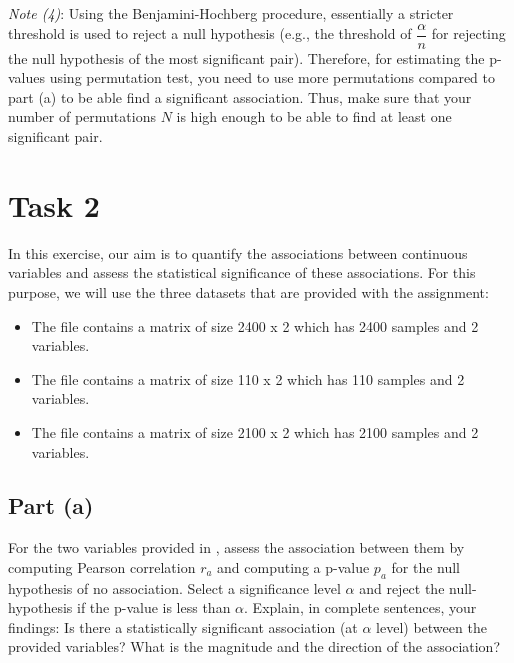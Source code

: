 \documentclass[11pt]{article}
\begin{document}
\vspace{0.2cm}
\noindent
\textit{Note (4)}: Using the Benjamini-Hochberg procedure, essentially a stricter threshold is used to reject a null hypothesis (e.g., the threshold of $\dfrac{\alpha}{n}$ for rejecting the null hypothesis of the most significant pair). Therefore, for estimating the p-values using permutation test, you need to use more permutations compared to part (a) to be able find a significant association. Thus, make sure that your number of permutations $N$ is high enough to be able to find at least one significant pair.

\section{Task 2}
In this exercise, our aim is to quantify the associations between continuous variables and assess the statistical significance of these associations. For this purpose, we will use the three datasets that are provided with the assignment:

\begin{itemize}
	\itemsep -0.3em 
	\item The file \filenameC contains a matrix of size 2400 x 2 which has 2400 samples and 2 variables. 
	\item The file \filenameD contains a matrix of size 110 x 2 which has 110 samples and 2 variables. 
	\item The file \filenameE contains a matrix of size 2100 x 2 which has 2100 samples and 2 variables. 
\end{itemize}

\subsection{Part (a)}

For the two variables provided in \filenameC, assess the association between them by computing Pearson correlation $r_a$ and computing a p-value $p_a$ for the null hypothesis of no association. Select a significance level $\alpha$ and reject the null-hypothesis if the p-value is less than $\alpha$. Explain, in complete sentences, your findings: Is there a statistically significant association (at $\alpha$ level) between the provided variables? What is the magnitude and the direction of the association?
\end{document}
